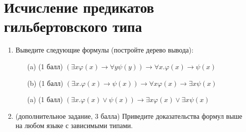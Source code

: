 \section{Исчисление предикатов гильбертовского типа}
\begin{enumerate}
  \item Выведите следующие формулы (постройте дерево вывода):
  \begin{itemize}
    \item[(a)] (1 балл) $(\exists x\varphi (x) \rightarrow  \forall y\psi (y)) \rightarrow  \forall x. \varphi (x) \rightarrow  \psi (x)$    
    \begin{solution}
        \hspace{0.01cm}
        \begin{prooftree}
        \end{prooftree}
      \end{solution}
    \item[(b)] (1 балл) $(\exists x. \varphi (x) \rightarrow  \psi (x)) \rightarrow  \forall x\varphi (x) \rightarrow  \exists x\psi (x)$
    \item[(a)] (1 балл) $(\exists x. \varphi (x) \lor  \psi (x)) \rightarrow  \exists x\varphi (x) \lor  \exists x\psi (x)$
  \end{itemize}
    \item (дополнительное задание, 3 балла) Приведите доказательства формул выше на любом
    языке с зависимыми типами.
\end{enumerate}
\clearpage
